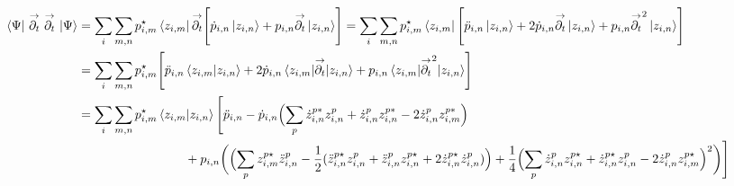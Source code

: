 \documentclass[prb]{revtex4}
\begin{document}
\begin{align*}					
\braket{\Psi |\  \overset{\rightarrow}{\partial_t}\ \overset{\rightarrow}{\partial_t}\ | \Psi} &= 
 \sum_i \sum_{m,n} p_{i,m}^{\star}  \bra{z_{i,m}}   \overset{\rightarrow}{\partial_t}  \Biggl[  \dot p_{i,n} \ket{z_{i,n}} + p_{i,n}\overset{\rightarrow}{\partial_t} \ket{  z_{i,n}}\Biggr] 
 =  \sum_i \sum_{m,n} p_{i,m}^{\star}  \bra{z_{i,m}}    \Biggl[  \ddot p_{i,n} \ket{z_{i,n}} + 2 \dot p_{i,n}\overset{\rightarrow}{\partial_t} \ket{  z_{i,n}}+ p_{i,n}\overset{\rightarrow}{\partial_t}^2 \ket{  z_{i,n}}\Biggr]  \notag \\
  &=  \sum_i \sum_{m,n} p_{i,m}^{\star}     \Biggl[  \ddot p_{i,n} \braket{z_{i,m}|z_{i,n}} + 2 \dot p_{i,n}\braket{z_{i,m}|\overset{\rightarrow}{\partial_t} |  z_{i,n}}+ p_{i,n}\braket{z_{i,m}|\overset{\rightarrow}{\partial_t}^2 |  z_{i,n}}\Biggr]  \notag \\
&=\sum_i \sum_{m,n} p_{i,m}^{\star}\braket{z_{i,m} | z_{i,n}} \Biggl[  
\ddot p_{i,n} 
-  \dot p_{i,n}  \Bigl( \sum_p  \dot z_{i,n}^{p*} z^p_{i,n}  + \dot z_{i,n}^{p} z^{p*}_{i,n} - 2 \dot z_{i,n}^{p} z^{p*}_{i,m} \Bigr) \notag \\ 
&\hspace{3cm}+ p_{i,n} \biggl(  \Bigl( \sum_pz_{i,m}^{p\star} \ddot z_{i,n}^{p} -\frac{1}{2}( \ddot z_{i,n}^{p\star} z_{i,n}^{p} + \ddot z_{i,n}^{p} z_{i,n}^{p\star} + 2\dot z_{i,n}^{p\star} \dot z_{i,n}^{p} )\Bigr)  +  \frac{1}{4}\Bigl( \sum_{p} \dot z_{i,n}^{p} z^{p\star}_{i,n} +  \dot z_{i,n}^{p\star} z^p_{i,n} - 2 \dot z_{i,n}^{p} z^{p\star}_{i,m}   \Bigr)^2   \biggr)
   \Biggl]
					  \end{align*}


%
%
\end{document}

